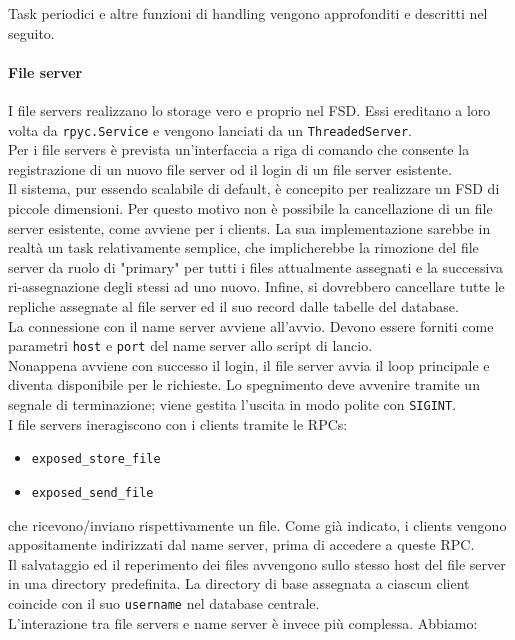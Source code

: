 \documentclass[a4paper, 12pt]{scrreprt}
\begin{document}
            Task periodici e altre funzioni di handling vengono approfonditi e descritti nel seguito.

        \paragraph{File server}

            I file servers realizzano lo storage vero e proprio nel FSD. Essi ereditano a loro volta da \texttt{rpyc.Service} e vengono lanciati da un \texttt{ThreadedServer}.\\
            Per i file servers è prevista un'interfaccia a riga di comando che consente la registrazione di un nuovo file server od il login di un file server esistente.\\
            Il sistema, pur essendo scalabile di default, è concepito per realizzare un FSD di piccole dimensioni. Per questo motivo non è possibile la cancellazione di un file server esistente, come avviene per i clients. La sua implementazione sarebbe in realtà un task relativamente semplice, che implicherebbe la rimozione del file server da ruolo di "primary" per tutti i files attualmente assegnati e la successiva ri-assegnazione degli stessi ad uno nuovo. Infine, si dovrebbero cancellare tutte le repliche assegnate al file server ed il suo record dalle tabelle del database.\\
            La connessione con il name server avviene all'avvio. Devono essere forniti come parametri \texttt{host} e \texttt{port} del name server allo script di lancio.\\
            Nonappena avviene con successo il login, il file server avvia il loop principale e diventa disponibile per le richieste. Lo spegnimento deve avvenire tramite un segnale di terminazione; viene gestita l'uscita in modo polite con \texttt{SIGINT}.\\
            I file servers ineragiscono con i clients tramite le RPCs:

            \begin{itemize}

                \item \texttt{exposed\_store\_file}

                \item \texttt{exposed\_send\_file}

            \end{itemize}

            che ricevono/inviano rispettivamente un file. Come già indicato, i clients vengono appositamente indirizzati dal name server, prima di accedere a queste RPC.\\
            Il salvataggio ed il reperimento dei files avvengono sullo stesso host del file server in una directory predefinita. La directory di base assegnata a ciascun client coincide con il suo \texttt{username} nel database centrale.\\
            L'interazione tra file servers e name server è invece più complessa. Abbiamo:
\end{document}
